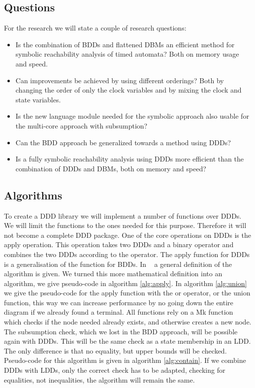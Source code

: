 \subsection{Questions}
For the research we will state a couple of research questions:
{\renewcommand\labelitemi{--}
	\begin{itemize}
		\item Is the combination of BDDs and flattened DBMs an efficient method for symbolic reachability analysis of timed automata? Both on memory usage and speed.
		\item Can improvements be achieved by using different orderings? Both by changing the order of only the clock variables and by mixing the clock and state variables.
		\item Is the new language module needed for the symbolic approach also usable for the multi-core approach with subsumption?
		\item Can the BDD approach be generalized towards a method using DDDs?
		\item Is a fully symbolic reachability analysis using DDDs more efficient than the combination of DDDs and DBMs, both on memory and speed?
	\end{itemize}
}

\subsection{Algorithms}
To create a DDD library we will implement a number of functions over DDDs. We will limit the functions to the ones needed for this purpose. Therefore it will not become a complete DDD package. One of the core operations on DDDs is the apply operation. This operation takes two DDDs and a binary operator and combines the two DDDs according to the operator. The apply function for DDDs is a generalisation of the function for BDDs. In ~\cite{ddds} a general definition of the algorithm is given. We turned this more mathematical definition into an algorithm, we give pseudo-code in algorithm \ref{alg:apply}. In algorithm \ref{alg:union} we give the pseudo-code for the apply function with the or operator, or the union function, this way we can increase performance by no going down the entire diagram if we already found a terminal. All functions rely on a Mk function which checks if the node needed already exists, and otherwise creates a new node.
The subsumption check, which we lost in the BDD approach, will be possible again with DDDs. This will be the same check as a state membership in an LDD. The only difference is that no equality, but upper bounds will be checked. Pseudo-code for this algorithm is given in algorithm \ref{alg:contain}. If we combine DDDs with LDDs, only the correct check has to be adapted, checking for equalities, not inequalities, the algorithm will remain the same.

